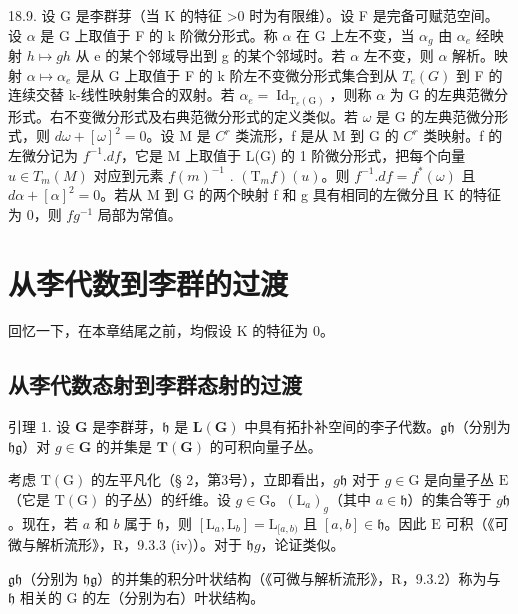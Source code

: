 18.9. 设 G 是李群芽（当 K 的特征 \textgreater0 时为有限维）。设 F 是完备可赋范空间。设 \(\alpha\) 是 G 上取值于 F 的 k 阶微分形式。称 \(\alpha\) 在 G 上左不变，当 \(\alpha_{g}\) 由 \(\alpha_{e}\) 经映射 \(h \mapsto gh\) 从 e 的某个邻域导出到 g 的某个邻域时。若 \(\alpha\) 左不变，则 \(\alpha\) 解析。映射 \(\alpha \mapsto \alpha_{e}\) 是从 G 上取值于 F 的 k 阶左不变微分形式集合到从 \(T_{e}(G)\) 到 F 的连续交替 k-线性映射集合的双射。若 \(\alpha_{e} = \operatorname{Id}_{\mathrm{T}_e(\mathrm{G})}\)，则称 \(\alpha\) 为 G 的左典范微分形式。右不变微分形式及右典范微分形式的定义类似。若 \(\omega\) 是 G 的左典范微分形式，则 \(d\omega + [\omega]^{2} = 0\)。设 M 是 \(C^{r}\) 类流形，f 是从 M 到 G 的 \(C^{r}\) 类映射。f 的左微分记为 \(f^{-1}.df\)，它是 M 上取值于 L(G) 的 1 阶微分形式，把每个向量 \(u \in T_{m}(M)\) 对应到元素 \(f(m)^{-1}\) . \((\mathrm{T}_{m}f)(u)\)。则 \(f^{-1}.df = f^{*}(\omega)\) 且 \(d\alpha + [\alpha]^{2} = 0\)。若从 M 到 G 的两个映射 f 和 g 具有相同的左微分且 K 的特征为 0，则 \(fg^{-1}\) 局部为常值。

\section{从李代数到李群的过渡}

回忆一下，在本章结尾之前，均假设 K 的特征为 0。

\subsection{从李代数态射到李群态射的过渡}

引理 1. 设 \(\mathbf{G}\) 是李群芽，\(\mathfrak{h}\) 是 \(\mathbf{L}(\mathbf{G})\) 中具有拓扑补空间的李子代数。\(\mathfrak{gh}\)（分别为 \(\mathfrak{hg}\)）对 \(g\in\mathbf{G}\) 的并集是 \(\mathbf{T}(\mathbf{G})\) 的可积向量子丛。

考虑 \(\mathrm{T}(\mathrm{G})\) 的左平凡化（§ 2，第3号），立即看出，\(g\mathfrak{h}\) 对于 \(g\in \mathrm{G}\) 是向量子丛 \(\mathrm{E}\)（它是 \(\mathrm{T}(\mathrm{G})\) 的子丛）的纤维。设 \(g\in \mathrm{G}\)。\((\mathrm{L}_a)_g\)（其中 \(a\in \mathfrak{h}\)）的集合等于 \(g\mathfrak{h}\)。现在，若 \(a\) 和 \(b\) 属于 \(\mathfrak{h}\)，则 \([\mathrm{L}_a,\mathrm{L}_b] = \mathrm{L}_{[a,b)}\) 且 \([a,b]\in \mathfrak{h}\)。因此 \(\mathrm{E}\) 可积（《可微与解析流形》，R，9.3.3 (iv)）。对于 \(\mathfrak{h}g\)，论证类似。

\(\mathfrak{gh}\)（分别为 \(\mathfrak{hg}\)）的并集的积分叶状结构（《可微与解析流形》，R，9.3.2）称为与 \(\mathfrak{h}\) 相关的 G 的左（分别为右）叶状结构。

